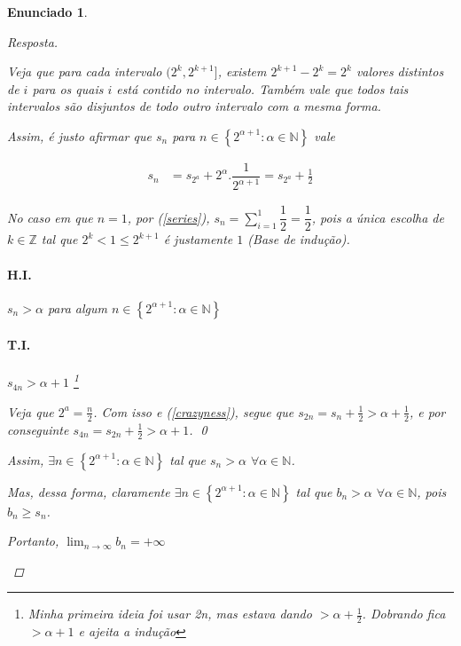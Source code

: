 \documentclass[a4paper,twoside,11pt]{article}
\newtheorem*{enunciado}{Enunciado}
\begin{document}
\begin{enunciado}
\begin{proof}[Resposta]
\begin{enumerate}[label=(\alph*)]
            

            Veja que para cada intervalo $(2^k, 2^{k+1}]$, existem
            $2^{k+1} - 2^k = 2^k$ valores distintos de $i$ para os quais $i$ está
            contido no intervalo. Também vale que todos tais intervalos são
            disjuntos de todo outro intervalo com a mesma forma.

            Assim, é justo afirmar que $s_n$ para $n \in \left\{2^{\alpha+1} : \alpha \in \mathbb{N}\right\}$
            vale

            \begin{equation}\label{crazyness}
                \begin{split}
                    s_n &= s_{2^a} + 2^\alpha . \dfrac{1}{2^{\alpha+1}}
                        = s_{2^a} + \frac{1}{2}
                \end{split}
            \end{equation}
            
            No caso em que $n = 1$, por (\ref{series}),
            $s_n = \sum^1_{i=1}\dfrac{1}{2} = \dfrac{1}{2}$,
            pois a única escolha de $k \in \mathbb{Z}$ tal que
            $2^k < 1 \leq 2^{k+1}$ é justamente $1$ (Base de indução).

            \paragraph{H.I.} $s_n > \alpha$ para algum $n \in \left\{2^{\alpha+1} : \alpha \in \mathbb{N}\right\}$
            \paragraph{T.I.} $s_{4n} > \alpha + 1$
            \footnote{
                Minha primeira ideia foi usar 2n,
                mas estava dando $>\alpha + \frac{1}{2}$.
                Dobrando fica $> \alpha + 1$ e ajeita a indução
            }

            Veja que $2^a = \frac{n}{2}$. Com isso e (\ref{crazyness}), segue
            que $s_{2n} = s_n + \frac{1}{2} > \alpha + \frac{1}{2}$, e por
            conseguinte $s_{4n} = s_{2n} + \frac{1}{2} > \alpha + 1$. \qed

            Assim, $\exists n \in \left\{2^{\alpha+1} : \alpha \in \mathbb{N}\right\}$
            tal que $s_n > \alpha$ $\forall \alpha \in \mathbb{N}$.

            Mas, dessa forma, claramente $\exists n \in \left\{2^{\alpha+1} : \alpha \in \mathbb{N}\right\}$
            tal que $b_n > \alpha$ $\forall \alpha \in \mathbb{N}$, pois $b_n \geq s_n$.

            Portanto, $\lim_{n \rightarrow \infty} b_n = +\infty$
        \end{enumerate}
    \end{proof}
\end{enunciado}
\end{document}
